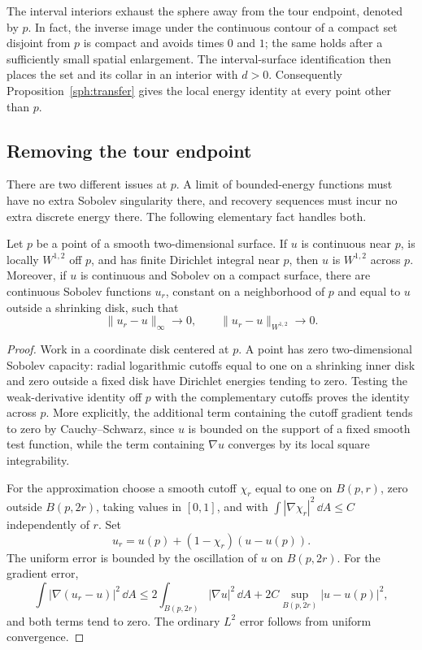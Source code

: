 The interval interiors exhaust the sphere away from the tour endpoint,
denoted by $p$.  In fact, the inverse image under the continuous contour
of a compact set disjoint from $p$ is compact and avoids times $0$ and
$1$; the same holds after a sufficiently small spatial enlargement.
The interval-surface identification then places the set and its collar
in an interior with $d>0$.  Consequently
Proposition~\ref{sph:transfer} gives the local energy identity at every
point other than $p$.

\subsection{Removing the tour endpoint}

There are two different issues at $p$.  A limit of bounded-energy
functions must have no extra Sobolev singularity there, and recovery
sequences must incur no extra discrete energy there.  The following
elementary fact handles both.

\begin{lemma}\label{sph:removability}
Let $p$ be a point of a smooth two-dimensional surface.
If $u$ is continuous near $p$, is locally $W^{1,2}$ off $p$, and has
finite Dirichlet integral near $p$, then $u$ is $W^{1,2}$ across $p$.
Moreover, if $u$ is continuous and Sobolev on a compact surface, there
are continuous Sobolev functions $u_r$, constant on a neighborhood of
$p$ and equal to $u$ outside a shrinking disk, such that
\[
 \|u_r-u\|_\infty\longrightarrow0,
 \qquad
 \|u_r-u\|_{W^{1,2}}\longrightarrow0.
\]
\end{lemma}

\begin{proof}
Work in a coordinate disk centered at $p$.  A point has zero
two-dimensional Sobolev capacity: radial logarithmic cutoffs equal to
one on a shrinking inner disk and zero outside a fixed disk have
Dirichlet energies tending to zero.  Testing the weak-derivative
identity off $p$ with the complementary cutoffs proves the identity
across $p$.  More explicitly, the additional term containing the
cutoff gradient tends to zero by Cauchy--Schwarz, since $u$ is bounded
on the support of a fixed smooth test function, while the term
containing $\nabla u$ converges by its local square integrability.

For the approximation choose a smooth cutoff $\chi_r$ equal to one
on $B(p,r)$, zero outside $B(p,2r)$, taking values in $[0,1]$, and
with $\int|\nabla\chi_r|^2\,\dd A\le C$ independently of $r$.
Set
\[
 u_r=u(p)+(1-\chi_r)(u-u(p)).
\]
The uniform error is bounded by the oscillation of $u$ on $B(p,2r)$.
For the gradient error,
\[
 \int|\nabla(u_r-u)|^2\,\dd A
 \le 2\int_{B(p,2r)}|\nabla u|^2\,\dd A
       +2C\sup_{B(p,2r)}|u-u(p)|^2,
\]
and both terms tend to zero.  The ordinary $L^2$ error follows from
uniform convergence.
\end{proof}


